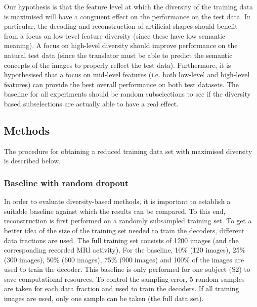 Our hypothesis is that the feature level at which the diversity of the training data is maximised will have a congruent effect on the performance on the test data. In particular, the decoding and reconstruction of artificial shapes should benefit from a focus on low-level feature diversity (since these have low semantic meaning). A focus on high-level diversity should improve performance on the natural test data (since the translator must be able to predict the semantic concepts of the images to properly reflect the test data). Furthermore, it is hypothesised that a focus on mid-level features (i.e. both low-level and high-level features) can provide the best overall performance on both test datasets. The baseline for all experiments should be random subselections to see if the diversity based subselections are actually able to have a real effect.



\subsection{Methods}

The procedure for obtaining a reduced training data set with maximised diversity is described below.

\subsubsection{Baseline with random dropout}

In order to evaluate diversity-based methods, it is important to establish a suitable baseline against which the results can be compared. To this end, reconstruction is first performed on a randomly subsampled training set. To get a better idea of the size of the training set needed to train the decoders, different data fractions are used. The full training set consists of 1200 images (and the corresponding recorded MRI activity). For the baseline, 10\% (120 images), 25\% (300 images), 50\% (600 images), 75\% (900 images) and 100\% of the images are used to train the decoder. This baseline is only performed for one subject (S2) to save computational resources. To control the sampling error, 5 random samples are taken for each data fraction and used to train the decoders. If all training images are used, only one sample can be taken (the full data set). 

